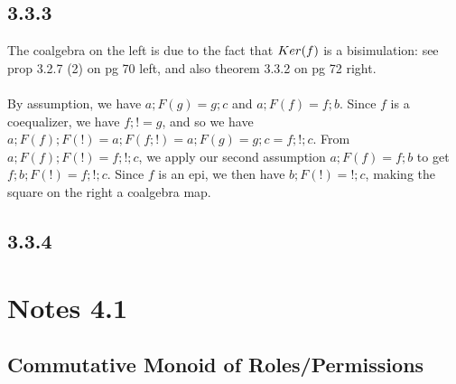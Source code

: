 \documentclass{article}
\begin{document}
\subsection*{3.3.3}

\begin{center}
\end{center}

The coalgebra on the left is due to the fact that $\mit{Ker}(f)$ is a bisimulation: see prop 3.2.7 (2) on pg 70 left,
and also theorem 3.3.2 on pg 72 right.\\~\\
By assumption, we have $a;F(g) = g;c$ and $a;F(f) = f;b$. Since $f$ is a coequalizer, we have $f;! = g$, and so
we have $a;F(f);F(!) = a;F(f;!) = a;F(g) = g;c = f;!;c$. From $a;F(f);F(!) = f;!;c$, we apply our second assumption
$a;F(f) = f;b$ to get $f;b;F(!) = f;!;c$. Since $f$ is an epi, we then have $b;F(!) = !;c$, making the square on
the right a coalgebra map.

\subsection*{3.3.4}

\section*{Notes 4.1}

\subsection*{Commutative Monoid of Roles/Permissions}
\end{document}

